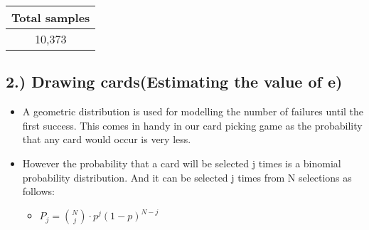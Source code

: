 \documentclass[11pt]{article}
\providecommand{\tightlist}{%
      \setlength{\itemsep}{0pt}\setlength{\parskip}{0pt}}
\begin{document}
\begin{longtable}[]{@{}c@{}}
\toprule
Total samples\tabularnewline
\midrule
\endhead
10,373\tabularnewline
\bottomrule
\end{longtable}

    \subsection{2.) Drawing cards(Estimating the value of
e)}\label{drawing-cardsestimating-the-value-of-e}

    \begin{itemize}
\item
  A geometric distribution is used for modelling the number of failures
  until the first success. This comes in handy in our card picking game
  as the probability that any card would occur is very less.
\item
  However the probability that a card will be selected j times is a
  binomial probability distribution. And it can be selected j times from
  N selections as follows:

  \begin{itemize}
  \tightlist
  \item
    \(P_j = \binom{N}{j} \cdot p^j(1-p)^{N-j}\)
  \end{itemize}
\end{itemize}
\end{document}
